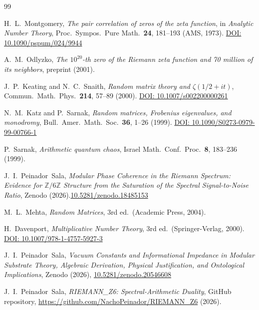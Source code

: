 \documentclass[12pt,a4paper]{article}
\theoremstyle{plain}
\theoremstyle{definition}
\theoremstyle{remark}
\begin{document}
\begin{thebibliography}{99}

H.~L.~Montgomery, \emph{The pair correlation of zeros of the zeta function}, in \emph{Analytic Number Theory}, Proc.\ Sympos.\ Pure Math.\ \textbf{24}, 181--193 (AMS, 1973). \href{https://doi.org/10.1090/pspum/024/9944}{DOI: 10.1090/pspum/024/9944}


A.~M.~Odlyzko, \emph{The \(10^{20}\)-th zero of the Riemann zeta function and 70 million of its neighbors}, preprint (2001).

J.~P.~Keating and N.~C.~Snaith, \emph{Random matrix theory and \(\zeta(1/2+it)\)}, Commun.\ Math.\ Phys.\ \textbf{214}, 57--89 (2000). \href{https://doi.org/10.1007/s002200000261}{DOI: 10.1007/s002200000261}


N.~M.~Katz and P.~Sarnak, \emph{Random matrices, Frobenius eigenvalues, and monodromy}, Bull.\ Amer.\ Math.\ Soc.\ \textbf{36}, 1--26 (1999). \href{https://doi.org/10.1090/S0273-0979-99-00766-1}{DOI: 10.1090/S0273-0979-99-00766-1}

P.~Sarnak, \emph{Arithmetic quantum chaos}, Israel Math.\ Conf.\ Proc.\ \textbf{8}, 183--236 (1999).


 J.~I.~Peinador~Sala, \emph{Modular Phase Coherence in the Riemann Spectrum: Evidence for $\mathbb{Z}/6\mathbb{Z}$ Structure from the Saturation of the Spectral Signal-to-Noise Ratio}, Zenodo (2026).\href{https://zenodo.org/records/18485153}{10.5281/zenodo.18485153}

M.~L.~Mehta, \emph{Random Matrices}, 3rd ed.\ (Academic Press, 2004).

H.~Davenport, \emph{Multiplicative Number Theory}, 3rd ed.\ (Springer-Verlag, 2000). \href{https://doi.org/10.1007/978-1-4757-5927-3}{DOI: 10.1007/978-1-4757-5927-3}

 J.~I.~Peinador~Sala, \emph{Vacuum Constants and Informational Impedance in Modular Substrate Theory, Algebraic Derivation, Physical Justification, and Ontological Implications}, Zenodo (2026), \href{https://zenodo.org/records/20546608}{10.5281/zenodo.20546608}

 J.~I.~Peinador~Sala, \emph{RIEMANN\_Z6: Spectral-Arithmetic Duality}, GitHub repository, \url{https://github.com/NachoPeinador/RIEMANN_Z6} (2026).
\end{thebibliography}
\end{document}
